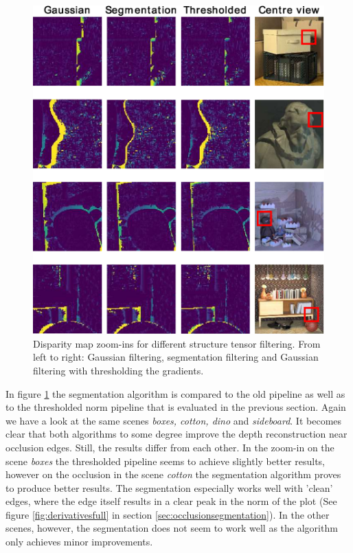 \documentclass  [
  paper    = a4,
  BCOR     = 10mm,
  twoside,
  fontsize = 12pt,
  fleqn,
  toc      = bibnumbered,
  toc      = listofnumbered,
  numbers  = noendperiod,
  headings = normal,
  listof   = leveldown,
  version  = 3.03
]                                       {scrreprt}
\begin{document}
\begin{figure}[h!]
	\centering
	\includegraphics[width=0.8\linewidth]{images/thresh_results_morph}
	\caption[Disparity map zoom-ins for different methods]{Disparity map zoom-ins for different structure tensor filtering. From left to right: Gaussian filtering, segmentation filtering and Gaussian filtering with thresholding the gradients.}
	\label{fig:threshresultsmorph}
\end{figure}
In figure \ref{fig:threshresultsmorph} the segmentation algorithm is compared to the old pipeline as well as to the thresholded norm pipeline that is evaluated in the previous section. Again we have a look at the same scenes \textit{boxes, cotton, dino} and \textit{sideboard}. It becomes clear that both algorithms to some degree improve the depth reconstruction near occlusion edges. Still, the results differ from each other. In the zoom-in on the scene \textit{boxes} the thresholded pipeline seems to achieve slightly better results, however on the occlusion in the scene \textit{cotton} the segmentation algorithm proves to produce better results. The segmentation especially works well with 'clean' edges, where the edge itself results in a clear peak in the norm of the plot (See figure \ref{fig:derivativesfull} in section \ref{sec:occlusionsegmentation}). In the other scenes, however, the segmentation does not seem to work well as the algorithm only achieves minor improvements.
\end{document}
